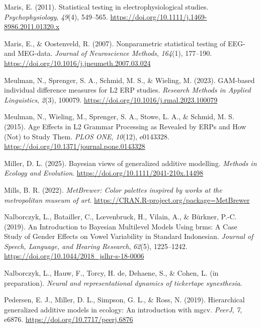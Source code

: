 \documentclass[
  doc,
  floatsintext,
  longtable,
  a4paper,
  nolmodern,
  notxfonts,
  notimes,
  colorlinks=true,linkcolor=blue,citecolor=blue,urlcolor=blue]{apa7}
\newlength{\cslhangindent}
\newenvironment{CSLReferences}[2] %
 {\begin{list}{}{%
  \setlength{\itemindent}{0pt}
  \setlength{\leftmargin}{0pt}
  \setlength{\parsep}{0pt}
  \ifodd #1
   \setlength{\leftmargin}{\cslhangindent}
   \setlength{\itemindent}{-1\cslhangindent}
  \fi
  \setlength{\itemsep}{#2\baselineskip}}}
 {\end{list}}
\begin{document}
\begin{CSLReferences}{1}{0}
Maris, E. (2011). Statistical testing in electrophysiological studies.
\emph{Psychophysiology}, \emph{49}(4), 549--565.
\url{https://doi.org/10.1111/j.1469-8986.2011.01320.x}

Maris, E., \& Oostenveld, R. (2007). Nonparametric statistical testing
of EEG- and MEG-data. \emph{Journal of Neuroscience Methods},
\emph{164}(1), 177--190.
\url{https://doi.org/10.1016/j.jneumeth.2007.03.024}

Meulman, N., Sprenger, S. A., Schmid, M. S., \& Wieling, M. (2023).
GAM-based individual difference measures for L2 ERP studies.
\emph{Research Methods in Applied Linguistics}, \emph{2}(3), 100079.
\url{https://doi.org/10.1016/j.rmal.2023.100079}

Meulman, N., Wieling, M., Sprenger, S. A., Stowe, L. A., \& Schmid, M.
S. (2015). Age Effects in L2 Grammar Processing as Revealed by ERPs and
How (Not) to Study Them. \emph{PLOS ONE}, \emph{10}(12), e0143328.
\url{https://doi.org/10.1371/journal.pone.0143328}

Miller, D. L. (2025). Bayesian views of generalized additive modelling.
\emph{Methods in Ecology and Evolution}.
\url{https://doi.org/10.1111/2041-210x.14498}

Mills, B. R. (2022). \emph{{MetBrewer}: Color palettes inspired by works
at the metropolitan museum of art}.
\url{https://CRAN.R-project.org/package=MetBrewer}

Nalborczyk, L., Batailler, C., Lœvenbruck, H., Vilain, A., \& Bürkner,
P.-C. (2019). An Introduction to Bayesian Multilevel Models Using brms:
A Case Study of Gender Effects on Vowel Variability in Standard
Indonesian. \emph{Journal of Speech, Language, and Hearing Research},
\emph{62}(5), 1225--1242.
\url{https://doi.org/10.1044/2018_jslhr-s-18-0006}

Nalborczyk, L., Hauw, F., Torcy, H. de, Dehaene, S., \& Cohen, L. (in
preparation). \emph{Neural and representational dynamics of tickertape
synesthesia}.

Pedersen, E. J., Miller, D. L., Simpson, G. L., \& Ross, N. (2019).
Hierarchical generalized additive models in ecology: An introduction
with mgcv. \emph{PeerJ}, \emph{7}, e6876.
\url{https://doi.org/10.7717/peerj.6876}


\end{CSLReferences}
\end{document}
